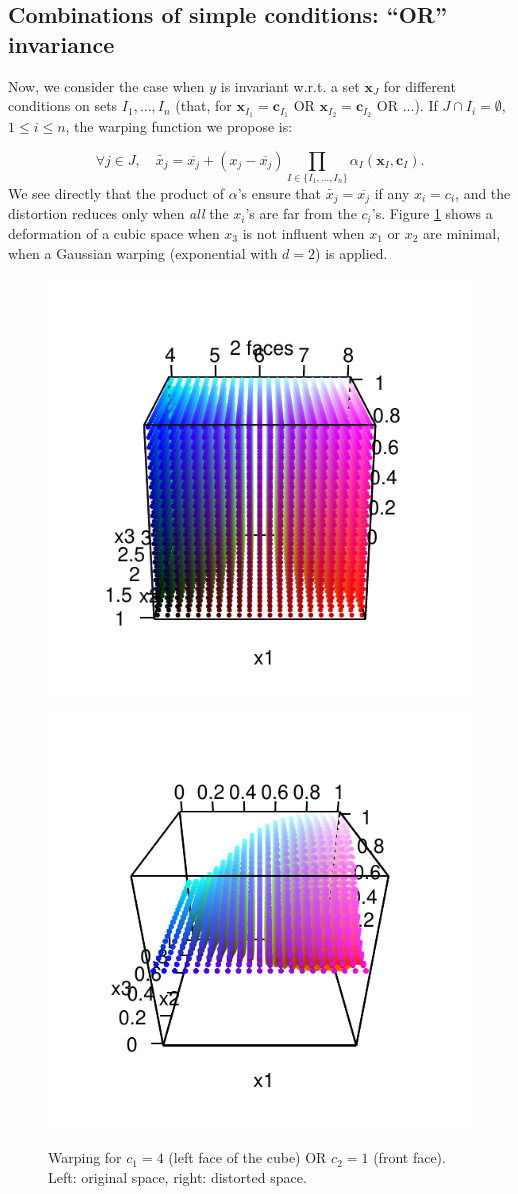 \documentclass[a4paper,10pt]{article}
\newcommand{\x}{\mathbf{x}}
\newcommand{\cc}{\mathbf{c}}
\begin{document}
\subsection{Combinations of simple conditions: ``OR'' invariance}
Now, we consider the case when $y$ is invariant w.r.t. a set $\x_J$ for different conditions on sets $I_1, \ldots, I_n$
(that, for $\x_{I_1}=\cc_{I_1}$ OR $\x_{I_2}=\cc_{I_2}$ OR $\ldots$).
If $J\cap I_i=\emptyset$, $1 \leq i \leq n$, the warping function we propose is:

\begin{equation}
 \forall j \in J, \quad \widetilde{x_j} = \overline{x_j} + \left( x_j - \overline{x_j}\right) \prod_{I \in \{I_1, \ldots, I_n \}}{\alpha_I}(\x_I, \cc_I)\label{eq:or0}. %
\end{equation}
% 
We see directly that the product of $\alpha$'s ensure that $\widetilde{x_j} = \overline{x_j}$
if any $x_i = c_i$, and the distortion reduces only when \emph{all} the $x_i$'s are far from the $c_i$'s.
Figure \ref{fig:def3DORs} shows a deformation of a cubic space when $x_3$ is not influent when $x_1$ or $x_2$ are minimal, when a Gaussian warping (exponential with $d=2$) is applied.
 \begin{figure}[!ht]
 \centering
 \includegraphics[width=.4\textwidth]{def3DORs.pdf}
 \includegraphics[width=.4\textwidth]{def3DOR2s.pdf}
 \caption{Warping for $c_1=4$ (left face of the cube) OR $c_2=1$ (front face). Left: original space, right: distorted space. %
 }\label{fig:def3DORs}
\end{figure}
\end{document}
